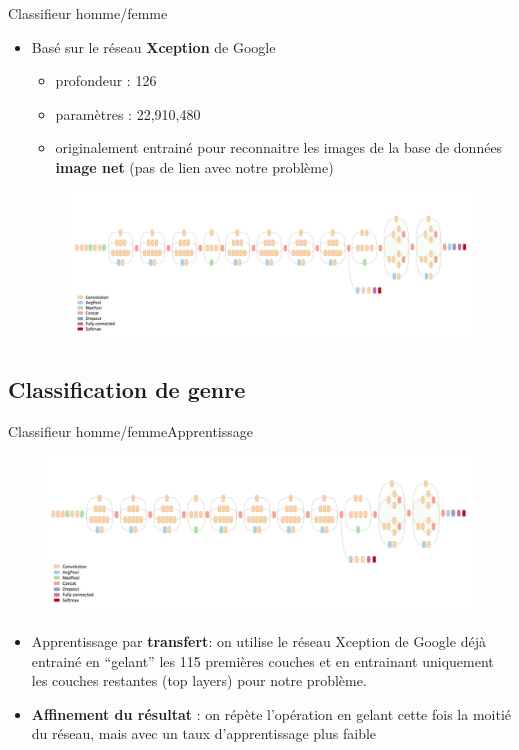 \documentclass[compress]{beamer}
\begin{document}
\begin{frame}{Classifieur homme/femme}
  \begin{itemize}
    \item Basé sur le réseau \textbf{Xception} de Google
    \begin{itemize}
      \item profondeur : 126
      \item paramètres : 22,910,480
      \item originalement entrainé pour reconnaitre les images de la base de données \textbf{image net} (pas de lien avec notre problème)
    \end{itemize}
    \begin{figure}
      \includegraphics[width=\linewidth]{resources/Xception}
    \end{figure}
  \end{itemize}
\end{frame}

\subsection{Classification de genre}

\begin{frame}{Classifieur homme/femme}{Apprentissage}\footnotesize
  \vspace{-.06\linewidth}
    \begin{figure}
      \includegraphics[width=\linewidth]{resources/Xception}
    \end{figure}
  \vspace{-.05\linewidth}
\begin{itemize}
    \item Apprentissage par \textbf{\color{fibeamer@orange}transfert}: on utilise le réseau Xception de Google déjà entrainé en ``gelant''
    les 115 premières couches et en entrainant uniquement les couches restantes (top layers) pour notre problème.
    \item \textbf{\color{fibeamer@orange}Affinement du résultat} : on répète l'opération en gelant cette fois la moitié du réseau, mais avec un taux d'apprentissage plus faible
\end{itemize}
\end{frame}
\end{document}
